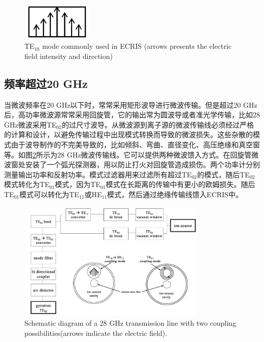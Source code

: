 \documentclass[fontset=windows]{article}
\begin{document}
\begin{figure}
    \centering
    \includegraphics[width=0.3\textwidth]{TE10.png}
    \caption{TE$_{10}$ mode commonly used in ECRIS (arrows presents the electric field intensity
    and direction)}
    \label{TE10}
\end{figure}



\subsection{频率超过20 GHz}

当微波频率在20 GHz以下时，常常采用矩形波导进行微波传输。但是超过20 GHz后，高功率微波源常常采用回旋管，它的输出常为圆波导或者准光学传输，比如28 GHz微波采用TE$_{02}$的过尺寸波导。从微波源到离子源的微波传输线必须经过严格的计算和设计，以避免传输过程中出现模式转换而导致的微波损失。这些杂散的模式由于波导制作的不完美导致的，比如倾斜、弯曲、直径变化、高压绝缘和真空窗等。如图\ref{f-3}所示为28 GHz微波传输线。它可以提供两种微波馈入方式。在回旋管微波窗处安装了一个弧光探测器，用以防止打火对回旋管造成损伤。两个功率计分别测量输出功率和反射功率。模式过滤器用来过滤所有超过TE$_{02}$的模式，随后TE$_{02}$模式转化为TE$_{01}$模式，因为TE$_{01}$模式在长距离的传输中有更小的欧姆损失。随后TE$_{01}$模式可以转化为TE$_{11}$或HE$_{11}$模式，然后通过绝缘传输线馈入ECRIS中。

\begin{figure}
    \centering
    \includegraphics[width=0.8\textwidth]{Schematic diagram.png}
    \caption{Schematic diagram of a 28 GHz transmission line with two coupling possibilities(arrows indicate the electric field).}
    \label{f-3}
\end{figure}
\end{document}

